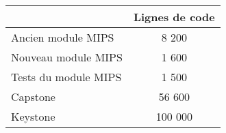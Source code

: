 \documentclass[11pt,class=book]{standalone}
\begin{document}
	\begin{tabularx}{0.7\textwidth}{X|c|}
		\cline{2-2}
		 & Lignes de code\\
		\hline
		\multicolumn{1}{|l|}{Ancien module MIPS}     & 8 200\\
		\hline
		\multicolumn{1}{|l|}{Nouveau module MIPS}    & 1 600\\
		\hline
		\multicolumn{1}{|l|}{Tests du module MIPS}   & 1 500\\
		\hline
		\multicolumn{1}{|l|}{Capstone}               & 56 600\\
		\hline
		\multicolumn{1}{|l|}{Keystone}               & 100 000\\
		\hline
	\end{tabularx}
\end{document}
